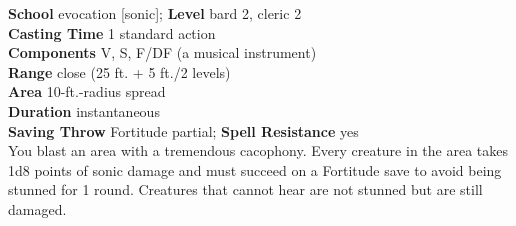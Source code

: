 \textbf{School} evocation [sonic]; \textbf{Level} bard 2, cleric 2\\
\textbf{Casting Time} 1 standard action\\
\textbf{Components} V, S, F/DF (a musical instrument)\\
\textbf{Range} close (25 ft. + 5 ft./2 levels)\\
\textbf{Area} 10-ft.-radius spread\\
\textbf{Duration} instantaneous\\
\textbf{Saving Throw} Fortitude partial; \textbf{Spell Resistance} yes\\
You blast an area with a tremendous cacophony. Every creature in the area takes 1d8 points of sonic damage and must succeed on a Fortitude save to avoid being stunned for 1 round. Creatures that cannot hear are not stunned but are still damaged.\\
